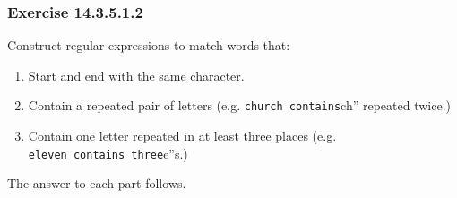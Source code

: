 \documentclass[]{book}
\providecommand{\tightlist}{%
  \setlength{\itemsep}{0pt}\setlength{\parskip}{0pt}}
\theoremstyle{plain}
\theoremstyle{remark}
\begin{document}
\hypertarget{exercise-14.3.5.1.2}{%
\subsubsection*{\texorpdfstring{Exercise
{14.3.5.1.2}}{Exercise 14.3.5.1.2}}\label{exercise-14.3.5.1.2}}

Construct regular expressions to match words that:

\begin{enumerate}
\def\labelenumi{\arabic{enumi}.}
\tightlist
\item
  Start and end with the same character.
\item
  Contain a repeated pair of letters (e.g.
  \texttt{church\textquotesingle{}\textquotesingle{}\ contains}ch''
  repeated twice.)
\item
  Contain one letter repeated in at least three places (e.g.
  \texttt{eleven\textquotesingle{}\textquotesingle{}\ contains\ three}e''s.)
\end{enumerate}

The answer to each part follows.
\end{document}
